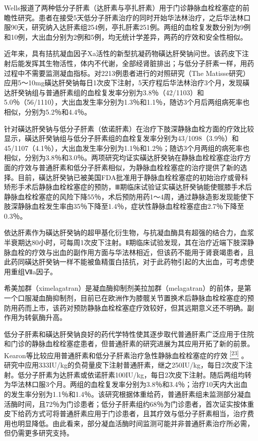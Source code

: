 Wells报道了两种低分子肝素（达肝素与亭扎肝素）用于门诊静脉血栓栓塞症的前瞻性研究。患者在接受5天低分子肝素治疗的同时开始华法林治疗，之后华法林口服90天，研究纳入达肝素组254例，亭扎肝素251例。两组的血栓复发数分别为9例和10例，大出血分别为2例和5例，均无统计学差异，两药的疗效和安全性相似。

近年来，具有拮抗凝血因子Xa活性的新型抗凝药物磺达肝癸钠问世。该药皮下注射后能发挥其生物活性，体内不代谢，全部经肾脏排出；与低分子肝素一样，用药过程中不需要监测凝血指标。对2213例患者进行的对照研究（The
Matisse研究）应用5～10mg磺达肝癸钠每日1次皮下注射，5天疗程后华法林治疗3个月，发现磺达肝癸钠组与普通肝素组的血栓复发率分别为3.8％（42/1103）和5.0％（56/1110），大出血发生率分别为1.3％和1.1％，随访3个月后两组病死率也相似，分别为5.2％和4.4％。

针对磺达肝癸钠与低分子肝素（依诺肝素）在治疗下肢深静脉血栓方面的疗效比较显示，磺达肝癸钠组与低分子肝素组的血栓复发率分别为43/1098（3.9％）和45/1107（4.1％），大出血发生率分别为1.1％和1.2％；随访3个月两组的病死率也相似，分别为3.8％和3.0％。两项研究均证实磺达肝癸钠在静脉血栓栓塞症治疗方面的疗效与普通肝素和低分子肝素相似，为静脉血栓栓塞症的治疗提供了新的选择。目前，磺达肝癸钠已被美国FDA批准用于静脉血栓栓塞症的初始治疗或骨科矫形手术后静脉血栓栓塞症的预防，Ⅲ期临床试验证实磺达肝癸钠能使髋膝手术后静脉血栓栓塞症的风险下降55％，术后预防用药1～4周，通过静脉造影发现能使下肢深静脉血栓发生率由35％下降至1.4％，症状性静脉血栓栓塞症由2.7％下降至0.3％。

依达肝素作为磺达肝癸钠的超甲基化衍生物，与抗凝血酶具有超强的结合力，血浆半衰期达80小时，可每周1次皮下注射。Ⅱ期临床试验发现，其在治疗近端下肢深静脉血栓的疗效与出血的副作用方面与华法林相近，但该药不能用于肾衰竭患者，且此药同磺达肝癸钠一样不能被鱼精蛋白拮抗，对于此药物引起的大出血，可考虑使用重组Ⅶa因子。

希美加群（ximelagatran）是凝血酶抑制剂美拉加群（melagatran）的前体，是第一个口服凝血酶抑制剂，目前已在欧洲作为膝髋关节置换术后静脉血栓栓塞症的预防用药而上市，该药对预防静脉血栓栓塞症疗效较好，但其远期意义还不明确。副作用为转氨酶升高。

低分子肝素和磺达肝癸钠良好的药代学特性使其逐步取代普通肝素广泛应用于住院和门诊的静脉血栓栓塞症患者，但普通肝素的研究进展为其应用开拓了新的前景。Kearon等比较应用普通肝素和低分子肝素治疗急性静脉血栓栓塞症的疗效
\protect\hyperlink{text00022.htmlux5cux23ch23-21}{\textsuperscript{{[}23{]}}}
。研究中应用333IU/kg的负荷量皮下注射普通肝素，继之250IU/kg，每日2次皮下注射。低分子肝素为达肝素或依诺肝素100IU/kg，每日2次皮下注射。随后两组均转为华法林口服3个月。两组的血栓复发率分别为3.8％和3.4％；治疗10天内大出血的发生率分别为1.1％和1.4％。该研究根据体重给药，普通肝素组未监测部分凝血活酶时间，且72％为门诊患者；低分子肝素组约68％为门诊患者，首次证实按体重皮下给药方式可将普通肝素应用于门诊患者，且其疗效与低分子肝素相当，治疗费用也明显降低。由此看来，部分凝血活酶时间监测可能并非普通肝素治疗所必需，但仍需更多研究支持。

